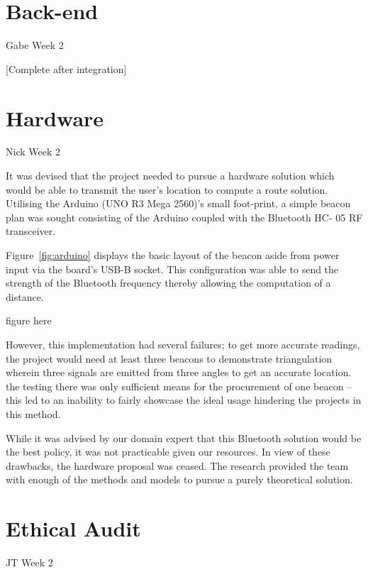 \section{Back-end}
Gabe Week 2

[Complete after integration]


\section{Hardware}
Nick Week 2

It was devised that the project needed to pursue a hardware solution which would be able to transmit the user’s location  to compute a route solution. Utilising the Arduino (UNO R3 Mega 2560)’s small foot-print, a simple beacon plan was sought consisting of the Arduino coupled with the Bluetooth HC- 05 RF transceiver. 

 
Figure~\ref{fig:arduino} displays the basic layout of the beacon aside from power input via the board’s USB-B socket. This configuration was able to send the strength of the Bluetooth frequency thereby allowing the computation of a distance.

figure here

However, this implementation had several failures; to get more accurate readings, the project would need at least three beacons to demonstrate triangulation wherein three signals are emitted from three angles to get an accurate location.  the testing there was only sufficient means for the procurement of one beacon – this led to an inability to fairly showcase the ideal usage  hindering the projects  in this method. 

While it was advised by our domain expert that this Bluetooth solution would be the best policy, it was not practicable given our resources. In view of these drawbacks, the hardware proposal was ceased. The research provided the team with enough of the methods and models to pursue a purely theoretical solution. 

\section{Ethical Audit}
JT Week 2

